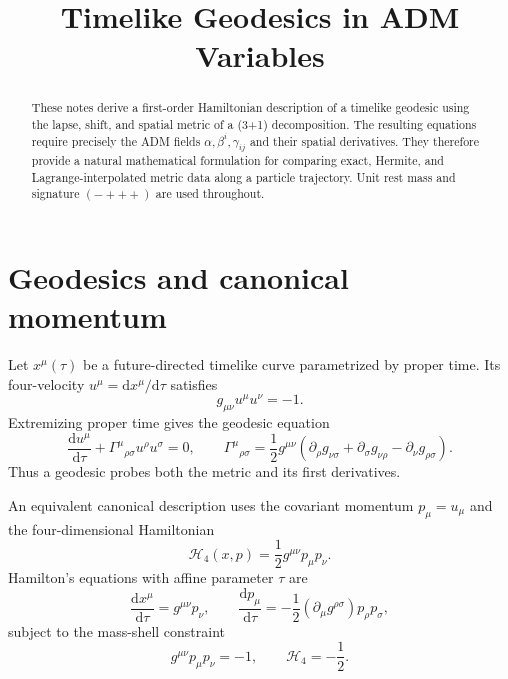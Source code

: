 \documentclass[11pt]{article}
\title{Timelike Geodesics in ADM Variables}
\author{}
\date{}
\newcommand{\dd}{\mathrm{d}}
\newcommand{\Ham}{\mathcal{H}}
\begin{document}
\maketitle

\begin{abstract}
These notes derive a first-order Hamiltonian description of a timelike
geodesic using the lapse, shift, and spatial metric of a (3+1)
decomposition.  The resulting equations require precisely the ADM fields
\(\alpha,\beta^i,\gamma_{ij}\) and their spatial derivatives.  They therefore
provide a natural mathematical formulation for comparing exact, Hermite, and
Lagrange-interpolated metric data along a particle trajectory.  Unit rest mass
and signature \((-+++)\) are used throughout.
\end{abstract}

\tableofcontents

\section{Geodesics and canonical momentum}

Let \(x^\mu(\tau)\) be a future-directed timelike curve parametrized by proper
time.  Its four-velocity \(u^\mu=\dd x^\mu/\dd\tau\) satisfies
\begin{equation}
 g_{\mu\nu}u^\mu u^\nu=-1.
 \label{eq:normalization}
\end{equation}
Extremizing proper time gives the geodesic equation
\begin{equation}
 \frac{\dd u^\mu}{\dd\tau}
 +\Gamma^\mu{}_{\rho\sigma}u^\rho u^\sigma=0,
 \qquad
 \Gamma^\mu{}_{\rho\sigma}
 =\frac12g^{\mu\nu}
 \left(\partial_\rho g_{\nu\sigma}
      +\partial_\sigma g_{\nu\rho}
      -\partial_\nu g_{\rho\sigma}\right).
 \label{eq:christoffel-geodesic}
\end{equation}
Thus a geodesic probes both the metric and its first derivatives.

An equivalent canonical description uses the covariant momentum
\(p_\mu=u_\mu\) and the four-dimensional Hamiltonian
\begin{equation}
 \Ham_4(x,p)=\frac12g^{\mu\nu}p_\mu p_\nu.
 \label{eq:four-hamiltonian}
\end{equation}
Hamilton's equations with affine parameter \(\tau\) are
\begin{equation}
 \frac{\dd x^\mu}{\dd\tau}=g^{\mu\nu}p_\nu,
 \qquad
 \frac{\dd p_\mu}{\dd\tau}
 =-\frac12(\partial_\mu g^{\rho\sigma})p_\rho p_\sigma,
 \label{eq:four-hamilton-equations}
\end{equation}
subject to the mass-shell constraint
\begin{equation}
 g^{\mu\nu}p_\mu p_\nu=-1,
 \qquad \Ham_4=-\frac12.
 \label{eq:mass-shell}
\end{equation}
\end{document}
